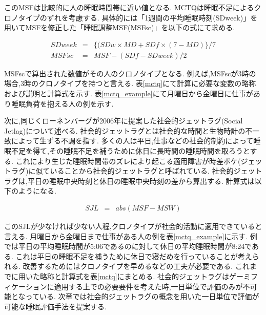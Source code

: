 このMSFは比較的に人の睡眠時間帯に近い値となる.
MCTQは睡眠不足によるクロノタイプのずれを考慮する.
具体的には「1週間の平均睡眠時刻(SDweek)」を用いてMSFを修正した「睡眠調整MSF(MSFsc)」を以下の式にて求める.

\begin{eqnarray}
	SDweek & = & \{(SDw × MD + SDf × (7 - MD)\} / 7 \\
	MSFsc & = & MSF - (SDf - SDweek) /2
\end{eqnarray}

MSFscで算出された数値がその人のクロノタイプとなる.
例えば,MSFscが3時の場合,3時のクロノタイプを持つと言える.
表\ref{mctq}にて計算に必要な変数の略称および説明と計算式を示す.
表\ref{mctq_example}にて月曜日から金曜日に仕事があり睡眠負荷を抱える人の例を示す.

次に,同じくローネンバーグが2006年に提案した社会的ジェットラグ(Social Jetlag\cite{SocialJetlag})について述べる.
社会的ジェットラグとは社会的な時間と生物時計の不一致によって生ずる不調を指す.
多くの人は平日,仕事などの社会的制約によって睡眠不足を得て,その睡眠不足を補うために休日に長時間の睡眠時間を取ろうとする.
これにより生じた睡眠時間帯のズレにより起こる適用障害が時差ボケ(ジェットラグ)に似ていることから社会的ジェットラグと呼ばれている.
社会的ジェットラグは,平日の睡眠中央時刻と休日の睡眠中央時刻の差から算出する.
計算式は以下のようになる.

\begin{eqnarray}
	SJL & = & abs(MSF - MSW)
\end{eqnarray}

このSJLが少なければ少ない人程,クロノタイプが社会的活動に適用できていると言える.
月曜日から金曜日まで仕事がある人の例を表\ref{mctq_example}に示す.
例では平日の平均睡眠時間が5:06であるのに対して休日の平均睡眠時間が8:24である.
これは平日の睡眠不足を補うために休日で寝だめを行っていることが考えられる.
改善するためにはクロノタイプを早めるなどの工夫が必要である.
これまでに用いた略称と計算式を表\ref{mctq}にまとめる.
社会的ジェットラグはゲーミフィケーションに適用する上での必要要件を考えた時,一日単位で評価のみが不可能となっている.
次章では社会的ジェットラグの概念を用いた一日単位で評価が可能な睡眠評価手法を提案する.

